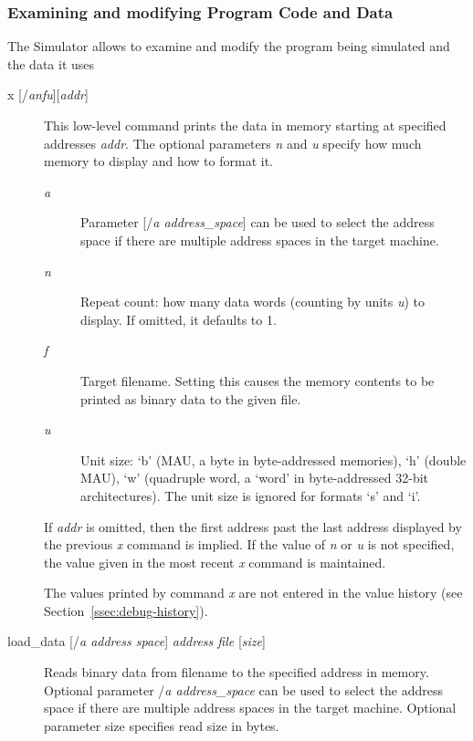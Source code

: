 \documentclass[twoside]{tceusermanual}
\begin{document}
\subsubsection{Examining and modifying Program Code and Data}
\label{ssec:debug-data}

The Simulator allows to examine and modify the program being simulated and
the data it uses

\begin{description}
\item[x {[/\emph{anfu}][\emph{addr}]}] %
  This low-level command prints the data in memory starting at specified
  addresses \emph{addr}.  The optional parameters \emph{n} and
  \emph{u} specify how much memory to display and how to format it.
  \begin{description}
  \item[\emph{a}] %
    Parameter [/\emph{a address\_space}] can be used to select the address
    space if there are multiple address spaces in the target machine.
  \item[\emph{n}] %
    Repeat count: how many data words (counting by units \emph{u}) to
    display.  If omitted, it defaults to 1.
  \item[\emph{f}] %
    Target filename. Setting this causes the memory contents to be printed 
    as binary data to the given file.
  \item[\emph{u}] %
    Unit size: `b' (MAU, a byte in byte-addressed memories), `h' (double
    MAU), `w' (quadruple word, a `word' in byte-addressed 32-bit
    architectures).  The unit size is ignored for formats `s' and `i'.
  \end{description}

  If \emph{addr} is omitted, then the first address past the last address
  displayed by the previous \emph{x} command is implied.  If the value of
  \emph{n} or \emph{u} is not specified, the value given in the
  most recent \emph{x} command is maintained.

  The values printed by command \emph{x} are not entered in the value
  history (see Section~\ref{ssec:debug-history}).

\item[load\_data {[/\emph{a address space}] \emph{address file }[\emph{size}]}] %

  Reads binary data from filename to the specified address in memory.
  Optional parameter /\emph{a address\_space} can be used to select the address
  space if there are multiple address spaces in the target machine.
  Optional parameter size specifies read size in bytes.


\end{description}
\end{document}
